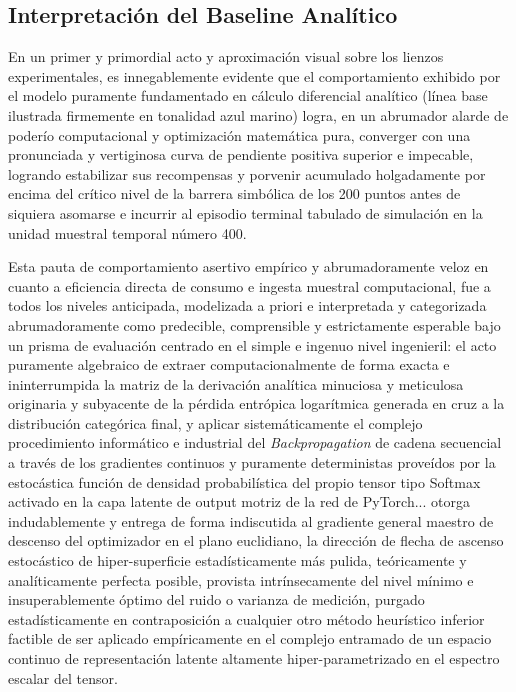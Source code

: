 \documentclass[a4paper,12pt,twocolumn]{article}
\begin{document}
\subsection{Interpretación del Baseline Analítico}
En un primer y primordial acto y aproximación visual sobre los lienzos experimentales, es innegablemente evidente que el comportamiento exhibido por el modelo puramente fundamentado en cálculo diferencial analítico (línea base ilustrada firmemente en tonalidad azul marino) logra, en un abrumador alarde de poderío computacional y optimización matemática pura, converger con una pronunciada y vertiginosa curva de pendiente positiva superior e impecable, logrando estabilizar sus recompensas y porvenir acumulado holgadamente por encima del crítico nivel de la barrera simbólica de los 200 puntos antes de siquiera asomarse e incurrir al episodio terminal tabulado de simulación en la unidad muestral temporal número 400.

Esta pauta de comportamiento asertivo empírico y abrumadoramente veloz en cuanto a eficiencia directa de consumo e ingesta muestral computacional, fue a todos los niveles anticipada, modelizada a priori e interpretada y categorizada abrumadoramente como predecible, comprensible y estrictamente esperable bajo un prisma de evaluación centrado en el simple e ingenuo nivel ingenieril: el acto puramente algebraico de extraer computacionalmente de forma exacta e ininterrumpida la matriz de la derivación analítica minuciosa y meticulosa originaria y subyacente de la pérdida entrópica logarítmica generada en cruz a la distribución categórica final, y aplicar sistemáticamente el complejo procedimiento informático e industrial del \textit{Backpropagation} de cadena secuencial a través de los gradientes continuos y puramente deterministas proveídos por la estocástica función de densidad probabilística del propio tensor tipo Softmax activado en la capa latente de output motriz de la red de PyTorch... otorga indudablemente y entrega de forma indiscutida al gradiente general maestro de descenso del optimizador en el plano euclidiano, la dirección de flecha de ascenso estocástico de hiper-superficie estadísticamente más pulida, teóricamente y analíticamente perfecta posible, provista intrínsecamente del nivel mínimo e insuperablemente óptimo del ruido o varianza de medición, purgado estadísticamente en contraposición a cualquier otro método heurístico inferior factible de ser aplicado empíricamente en el complejo entramado de un espacio continuo de representación latente altamente hiper-parametrizado en el espectro escalar del tensor. 
\end{document}
